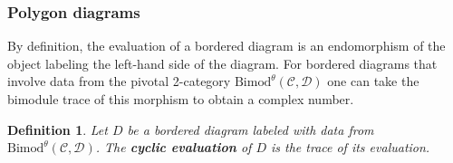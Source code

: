\documentclass[1.5pt, a4paper]{article}
\newcommand{\mac}{\mathcal C}
\newcommand{\mad}{\mathcal D}
\newcommand{\Bimod}{\mathrm{Bimod}}
\newtheorem{definition}[theorem]{Definition}
\begin{document}
\subsubsection{Polygon diagrams}
\label{subsec:polygondiags}

By definition, the evaluation of a bordered diagram is an endomorphism of the object labeling the left-hand side of the diagram.  
For bordered diagrams that involve data from the pivotal 2-category  $\Bimod^\theta(\mac,\mad)$ one can take the bimodule trace of this morphism to obtain a complex number. 


\begin{definition} Let $D$ be a bordered diagram labeled with data from $\Bimod^\theta(\mac,\mad)$. The {\bf cyclic evaluation} of $D$ is the trace of its evaluation. 
\end{definition}
\end{document}

